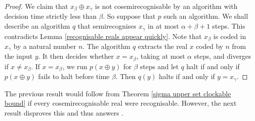\documentclass[a4paper,11pt]{amsart}
\theoremstyle{definition}
\newtheorem*{problem A}{Problem 1}
\newtheorem*{problem B}{Problem 2}
\theoremstyle{remark}
\begin{document}
\begin{proof}
We claim that $x_\beta\oplus x_\gamma$ is not cosemirecognisable by an algorithm with decision time strictly less than $\beta$. 
So suppose that $p$ such an algorithm. 
We shall describe an algorithm $q$ that semirecognises $x_\gamma$ in at most $\alpha+\beta+1$ steps. 
This contradicts Lemma \ref{recognisable reals appear quickly}. 
Note that $x_\beta$ is coded in $x_\gamma$ by a natural number $n$. 
The algorithm $q$ extracts the real $x$ coded by $n$ from the input $y$. 
It then decides whether $x= x_\beta$, taking at most $\alpha$ steps, and diverges if $x\neq x_\beta$. 
If $x=x_\beta$, we run $p(x\oplus y)$ for $\beta$ steps and let $q$ halt if and only if $p(x\oplus y)$ fails to halt before time $\beta$. 
Then $q(y)$ halts if and only if $y=x_\gamma$. 
\end{proof} 


The previous result would follow from Theorem \ref{sigma upper set clockable bound} if every cosemirecognisable real were recognisable. 
However, the next result disproves this and thus answers \cite[Question 4.5.5]{carl2019ordinal}. 

\end{document}
